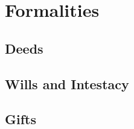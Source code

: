 \chapter{Formalities}



\section{Deeds}





\begin{questions}

\end{questions}



\begin{questions}

\end{questions}





\section{Wills and Intestacy}











\begin{questions}

\end{questions}



\begin{questions}

\end{questions}




\section{Gifts}

